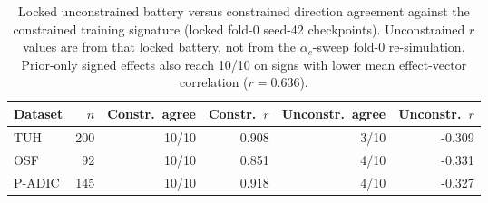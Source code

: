 \begin{table}[!t]
\centering
\caption{Locked unconstrained battery versus constrained direction agreement against the constrained training signature (locked fold-0 seed-42 checkpoints). Unconstrained $r$ values are from that locked battery, not from the $\alpha_c$-sweep fold-0 re-simulation. Prior-only signed effects also reach 10/10 on signs with lower mean effect-vector correlation ($r{=}0.636$).}
\label{tab:ablation-direction}
\setlength{\tabcolsep}{4pt}
\begin{tabular}{lrrrrr}
\toprule
Dataset & $n$ & Constr.\ agree & Constr.\ $r$ & Unconstr.\ agree & Unconstr.\ $r$ \\
\midrule
TUH & 200 & 10/10 & 0.908 & 3/10 & -0.309 \\
OSF & 92 & 10/10 & 0.851 & 4/10 & -0.331 \\
P-ADIC & 145 & 10/10 & 0.918 & 4/10 & -0.327 \\
\bottomrule
\end{tabular}
\end{table}
